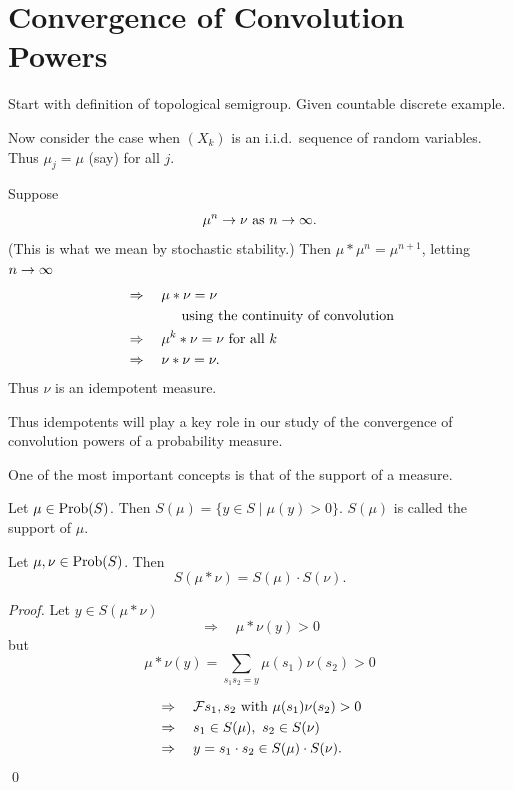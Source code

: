 

\section{Convergence of Convolution Powers}
\label{sec:3.2}


Start with definition of topological semigroup.  
Given countable discrete example.

Now consider the case when $(X_k)$ is an i.i.d.\ sequence of random variables.  
Thus $\mu_j = \mu$ (say) for all $j$.

     Suppose
\[
     \mu^n \to \nu \hbox{ as } n \to \infty.
\]
(This is what we mean by stochastic stability.)
Then $\mu * \mu^n = \mu^{n+1}$, letting $n \to \infty$
\[
\begin{aligned}
       &\Rightarrow \quad \mu * \nu = \nu                  \\
       &\qquad \qquad \hbox{using the continuity of convolution} \\
       &\Rightarrow \quad \mu^k * \nu = \nu \hbox{ for all } k         \\
       &\Rightarrow \quad \nu * \nu = \nu.
\end{aligned}
\]
Thus $\nu$ is an idempotent measure.

Thus idempotents will play a key role in our study of the convergence of convolution powers of a probability measure.

One of the most important concepts is that of the support of a
measure.

\begin{definition}   \label{defn:3.2}
Let $\mu \in \hbox{Prob}(S)$.  
Then $S(\mu) = \{ y \in S \mid \mu(y) > 0 \}$.  
$S(\mu)$ is called the support of $\mu$.
\end{definition}
 
\begin{proposition} 	\label{prp:3.1}
Let $\mu,\nu \in \hbox{Prob}(S)$.  
Then
\[
     S(\mu * \nu) = S(\mu) \cdot S(\nu).
\]
\end{proposition}

\begin{proof}  
Let $y \in S(\mu * \nu)$
\[
     \Rightarrow \quad \mu * \nu(y) > 0
\]
but
\[
     \mu * \nu(y) = \sum_{s_1s_2 = y} \mu(s_1) \nu(s_2) > 0
\]

\[
\begin{aligned}
       &\Rightarrow \quad \mathcal{F} s_1,s_2 \hbox{ with } \mu(s_1) \nu(s_2) > 0 \\
       &\Rightarrow \quad s_1 \in S(\mu), \ s_2 \in S(\nu)             \\
       &\Rightarrow \quad y = s_1 \cdot s_2 \in S(\mu) \cdot S(\nu).
\end{aligned}
\]
\qed
\end{proof}

